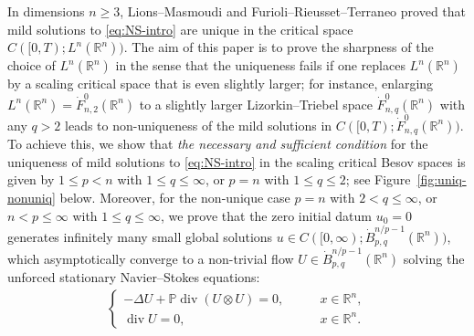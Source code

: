\documentclass[a4paper,12pt,reqno]{amsart}
\theoremstyle{plain}
\theoremstyle{definition}
\renewcommand{\div}{\operatorname{div}}
\newcommand{\dB}{\dot{B}}
\renewcommand{\leq}{\leqslant}
\renewcommand{\geq}{\geqslant}
\newcommand{\R}{\mathbb{R}}
\begin{document}
In dimensions $n \geq 3$,
Lions--Masmoudi \cite{Lio-Mas} and Furioli--Rieusset--Terraneo \cite{Fur-Rie-Ter-2000} proved that mild solutions to \eqref{eq:NS-intro} are unique in the critical space $C([0,T);L^n(\R^n))$.
The aim of this paper is to prove the sharpness of the choice of $L^n(\R^n)$ in the sense that the uniqueness fails if one replaces $L^n(\R^n)$ by a scaling critical space that is even slightly larger;
for instance, enlarging $L^n(\R^n)=\dot{F}_{n,2}^0(\R^n)$ to a slightly larger Lizorkin--Triebel space $\dot{F}_{n,q}^0(\R^n)$ with any $q>2$ leads to non-uniqueness of the mild solutions in $C([0,T);\dot{F}_{n,q}^0(\R^n))$. 
To achieve this, 
we show that \emph{the necessary and sufficient condition} for the uniqueness of mild solutions to \eqref{eq:NS-intro} in the scaling critical Besov spaces
is given by $1 \leq p < n$ with $1 \leq q \leq \infty$, or $p=n$ with $1 \leq q \leq 2$; see Figure~\ref{fig:uniq-nonuniq} below.
Moreover, for the non-unique case $p=n$ with $2<q\leq \infty$, or $n < p \leq \infty$ with $1 \leq q \leq \infty$,
we prove that the zero initial datum $u_0=0$ generates infinitely many small global solutions $u \in C([0,\infty);\dB_{p,q}^{n/p-1}(\R^n))$, which asymptotically converge to a non-trivial flow $U \in \dB_{p,q}^{n/p-1}(\R^n)$ solving the unforced stationary Navier--Stokes equations:
\begin{align}\label{eq:sNS}
    \begin{cases}
        -\Delta U + \mathbb{P} \div (U \otimes U) = 0, \qquad & x \in \mathbb{R}^n,\\
        \div U = 0, \qquad & x \in \mathbb{R}^n.
    \end{cases}
\end{align}
\end{document}
